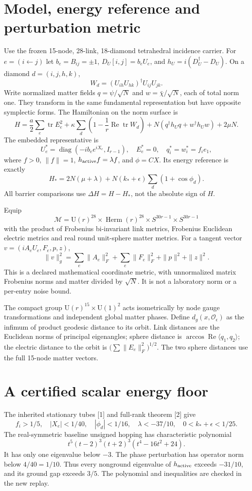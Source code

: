 \documentclass[11pt,a4paper]{article}
\newcommand{\tr}{\operatorname{tr}}\newcommand{\diag}{\operatorname{diag}}\newcommand{\Rea}{\operatorname{Re}}\newcommand{\id}{\mathbf1}
\begin{document}
\section{Model, energy reference and perturbation metric}
Use the frozen 15-node, 28-link, 18-diamond tetrahedral incidence carrier. For $e=(i\leftarrow j)$ let $b_e=B_{ij}=\pm1$, $D_U[i,j]=b_eU_e$, and $h_U=i(D_U^\dagger-D_U)$. On a diamond $d=(i,j,h,k)$,
\[
W_d=(U_{ih}U_{hk})^\dagger U_{ij}U_{jk}.
\]
Write normalized matter fields $q=\psi/\sqrt N$ and $w=\bar\chi/\sqrt N$, each of total norm one. They transform in the same fundamental representation but have opposite symplectic forms. The Hamiltonian on the norm surface is
\[
H=\frac a2\sum_e\tr E_e^2+\kappa\sum_d\left(1-\frac1r\Rea\tr W_d\right)
+N(q^\dagger h_Uq+w^\dagger h_Uw)+2\mu N.
\]
The embedded representative is
\[
U_e^*=\diag(-ib_ee^{iX_e},I_{r-1}),\quad E_e^*=0,\quad q_i^*=w_i^*=f_i e_1,
\]
where $f>0$, $\|f\|=1$, $h_{\rm active}f=\lambda f$, and $\phi=CX$. Its energy reference is exactly
\[
H_*=2N(\mu+\lambda)+N(k_*+\epsilon)\sum_d(1+\cos\phi_d).
\]
All barrier comparisons use $\Delta H=H-H_*$, not the absolute sign of $H$.

Equip
\[
\mathcal M=\mathrm U(r)^{28}\times\operatorname{Herm}(r)^{28}
\times S^{30r-1}\times S^{30r-1}
\]
with the product of Frobenius bi-invariant link metrics, Frobenius Euclidean electric metrics and real round unit-sphere matter metrics. For a tangent vector $v=(iA_eU_e,F_e,p,z)$,
\begin{equation}\label{eq:metric}
\|v\|_g^2=\sum_e\|A_e\|_F^2+\sum_e\|F_e\|_F^2+\|p\|^2+\|z\|^2.
\end{equation}
This is a declared mathematical coordinate metric, with unnormalized matrix Frobenius norms and matter divided by $\sqrt N$. It is not a laboratory norm or a per-entry noise bound.

The compact group $\mathrm U(r)^{15}\times\mathrm U(1)^2$ acts isometrically by node gauge transformations and independent global matter phases. Define $d_g(x,\mathcal O_\epsilon)$ as the infimum of product geodesic distance to its orbit. Link distances are the Euclidean norms of principal eigenangles; sphere distance is $\arccos\Rea\langle q_1,q_2\rangle$; the electric distance to the orbit is $\big(\sum\|E_e\|_F^2\big)^{1/2}$. The two sphere distances use the full 15-node matter vectors.
\newpage
\section{A certified scalar energy floor}
The inherited stationary tubes [1] and full-rank theorem [2] give
\[
f_i>1/5,\quad |X_e|<1/40,\quad |\phi_d|<1/16,\quad
\lambda<-37/10,\quad 0<k_*+\epsilon<1/25.
\]
The real-symmetric baseline unsigned hopping has characteristic polynomial
\[
t^5(t-2)^3(t+2)^3(t^4-16t^2+24).
\]
It has only one eigenvalue below $-3$. The phase perturbation has operator norm below $4/40=1/10$. Thus every nonground eigenvalue of $h_{\rm active}$ exceeds $-31/10$, and its ground gap exceeds $3/5$. The polynomial and inequalities are checked in the new replay.
\end{document}
